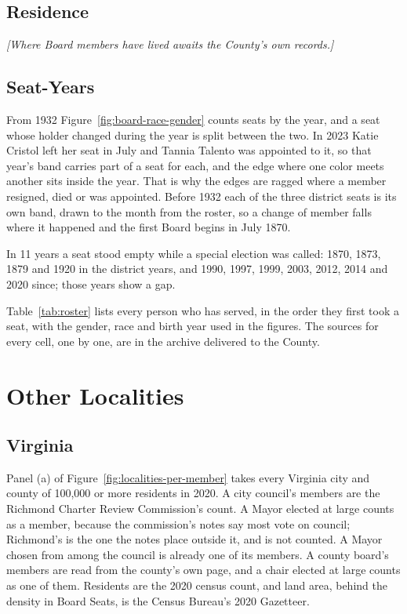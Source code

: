 \subsection{Residence}
\textit{[Where Board members have lived awaits the County's own records.]}

\subsection{Seat-Years}
From 1932 Figure~\ref{fig:board-race-gender} counts seats by the year, and a seat
whose holder changed during the year is split between the two. In 2023 Katie
Cristol left her seat in July and Tannia Talento was appointed to it, so that
year's band carries part of a seat for each, and the edge where one color meets
another sits inside the year. That is why the edges are ragged where a member
resigned, died or was appointed. Before 1932 each of the three district seats
is its own band, drawn to the month from the roster, so a change of member falls
where it happened and the first Board begins in July 1870.

In 11 years a seat stood empty while a special election was called: 1870, 1873,
1879 and 1920 in the district years, and 1990, 1997, 1999, 2003, 2012, 2014 and
2020 since; those years show a gap.

Table~\ref{tab:roster} lists every person who has served, in the order they
first took a seat, with the gender, race and birth year used in the figures. The
sources for every cell, one by one, are in the archive delivered to the
County.



\section*{Other Localities}

\subsection{Virginia}
Panel (a) of Figure~\ref{fig:localities-per-member} takes every Virginia city and
county of 100,000 or more residents in 2020. A city council's members are the
Richmond Charter Review Commission's count.\autocite[120--21]{richmond2023} A Mayor
elected at large counts as a member, because the commission's notes say most vote on
council; Richmond's is the one the notes place outside it, and is not counted. A
Mayor chosen from among the council is already one of its members. A county board's
members are read from the county's own page, and a chair elected at large counts as
one of them. Residents are the 2020 census count,\autocite{censusapi} and land area,
behind the density in Board Seats, is the Census Bureau's 2020
Gazetteer.\autocite{censusgazetteer2020}

